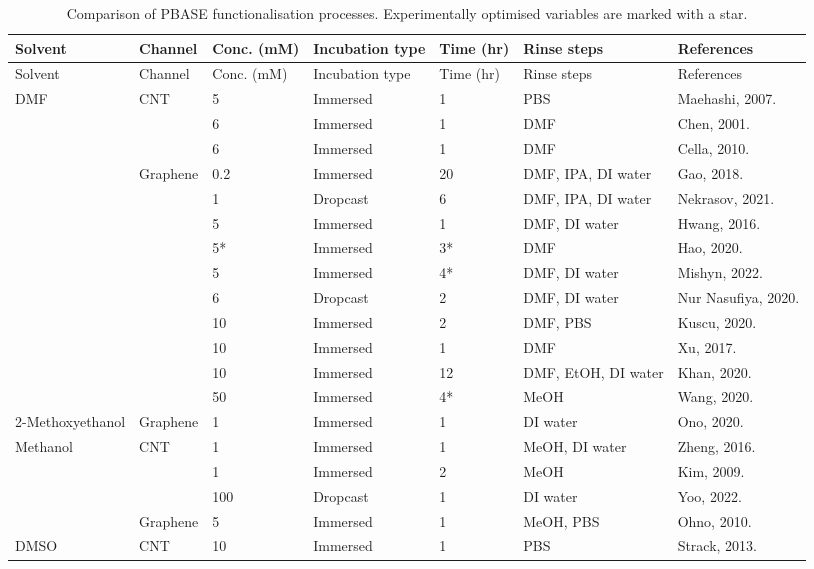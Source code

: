 \documentclass[
  a4paper,
]{scrbook}
\begin{document}
\begin{landscape}
\begin{center}

\hypertarget{tbl-pbase-functionalisation}{}
\begin{longtable}[]{@{}lllllll@{}}
\caption{\label{tbl-pbase-functionalisation}Comparison of PBASE
functionalisation processes. Experimentally optimised variables are
marked with a star.}\tabularnewline
\toprule\noalign{}
Solvent & Channel & Conc. (mM) & Incubation type & Time (hr) & Rinse
steps & References \\
\midrule\noalign{}
\endfirsthead
\toprule\noalign{}
Solvent & Channel & Conc. (mM) & Incubation type & Time (hr) & Rinse
steps & References \\
\midrule\noalign{}
\endhead
\bottomrule\noalign{}
\endlastfoot
DMF & CNT & 5 & Immersed & 1 & PBS & Maehashi, 2007.
\cite{Maehashi2007} \\
& & 6 & Immersed & 1 & DMF & Chen, 2001. \cite{Chen2001} \\
& & 6 & Immersed & 1 & DMF & Cella, 2010. \cite{Cella2010} \\
& Graphene & 0.2 & Immersed & 20 & DMF, IPA, DI water & Gao, 2018.
\cite{Gao2018} \\
& & 1 & Dropcast & 6 & DMF, IPA, DI water & Nekrasov, 2021.
\cite{Nekrasov2021} \\
& & 5 & Immersed & 1 & DMF, DI water & Hwang, 2016. \cite{Hwang2016} \\
& & 5* & Immersed & 3* & DMF & Hao, 2020. \cite{Hao2020} \\
& & 5 & Immersed & 4* & DMF, DI water & Mishyn, 2022.
\cite{Mishyn2022} \\
& & 6 & Dropcast & 2 & DMF, DI water & Nur Nasufiya, 2020.
\cite{NurNasyifa2020} \\
& & 10 & Immersed & 2 & DMF, PBS & Kuscu, 2020. \cite{Kuscu2020} \\
& & 10 & Immersed & 1 & DMF & Xu, 2017. \cite{Xu2017} \\
& & 10 & Immersed & 12 & DMF, EtOH, DI water & Khan, 2020.
\cite{Khan2020} \\
& & 50 & Immersed & 4* & MeOH & Wang, 2020. \cite{Wang2020} \\
2-Methoxyethanol & Graphene & 1 & Immersed & 1 & DI water & Ono, 2020.
\cite{Ono2020} \\
Methanol & CNT & 1 & Immersed & 1 & MeOH, DI water & Zheng, 2016.
\cite{Zheng2016} \\
& & 1 & Immersed & 2 & MeOH & Kim, 2009. \cite{Kim2009} \\
& & 100 & Dropcast & 1 & DI water & Yoo, 2022. \cite{Yoo2022} \\
& Graphene & 5 & Immersed & 1 & MeOH, PBS & Ohno, 2010.
\cite{Ohno2010} \\
DMSO & CNT & 10 & Immersed & 1 & PBS & Strack, 2013.
\cite{Strack2013} \\
\end{longtable}

\end{center}
\end{landscape}
\restoregeometry %
\end{document}
